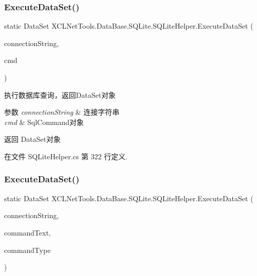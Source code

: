 \subsubsection{\texorpdfstring{Execute\+Data\+Set()}{ExecuteDataSet()}\hspace{0.1cm}{\footnotesize\ttfamily [1/3]}}
{\footnotesize\ttfamily static Data\+Set X\+C\+L\+Net\+Tools.\+Data\+Base.\+S\+Q\+Lite.\+S\+Q\+Lite\+Helper.\+Execute\+Data\+Set (\begin{DoxyParamCaption}\item[{string}]{connection\+String,  }\item[{S\+Q\+Lite\+Command}]{cmd }\end{DoxyParamCaption})\hspace{0.3cm}{\ttfamily [static]}}



执行数据库查询，返回\+Data\+Set对象 


\begin{DoxyParams}{参数}
{\em connection\+String} & 连接字符串\\
\hline
{\em cmd} & Sql\+Command对象\\
\hline
\end{DoxyParams}
\begin{DoxyReturn}{返回}
Data\+Set对象
\end{DoxyReturn}


在文件 S\+Q\+Lite\+Helper.\+cs 第 322 行定义.

\mbox{\label{class_x_c_l_net_tools_1_1_data_base_1_1_s_q_lite_1_1_s_q_lite_helper_a4806433651289941b9507696bb3a64d0}} 
\subsubsection{\texorpdfstring{Execute\+Data\+Set()}{ExecuteDataSet()}\hspace{0.1cm}{\footnotesize\ttfamily [2/3]}}
{\footnotesize\ttfamily static Data\+Set X\+C\+L\+Net\+Tools.\+Data\+Base.\+S\+Q\+Lite.\+S\+Q\+Lite\+Helper.\+Execute\+Data\+Set (\begin{DoxyParamCaption}\item[{string}]{connection\+String,  }\item[{string}]{command\+Text,  }\item[{Command\+Type}]{command\+Type }\end{DoxyParamCaption})\hspace{0.3cm}{\ttfamily [static]}}




